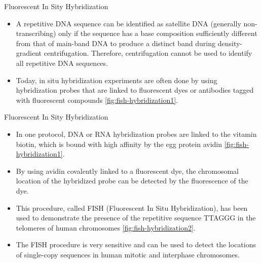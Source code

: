 \documentclass[
  ignorenonframetext,
  aspectratio=169]{beamer}
\providecommand{\tightlist}{%
  \setlength{\itemsep}{0pt}\setlength{\parskip}{0pt}}
\begin{document}
\begin{frame}{Fluorescent In Sity Hybridization}
\protect\hypertarget{fluorescent-in-sity-hybridization}{}
\begin{itemize}
\tightlist
\item
  A repetitive DNA sequence can be identified as satellite DNA
  (generally non-transcribing) only if the sequence has a base
  composition sufficiently different from that of main-band DNA to
  produce a distinct band during density-gradient centrifugation.
  Therefore, centrifugation cannot be used to identify all repetitive
  DNA sequences.
\item
  Today, in situ hybridization experiments are often done by using
  hybridization probes that are linked to fluorescent dyes or antibodies
  tagged with fluorescent compounds \ref{fig:fish-hybridization1}.
\end{itemize}
\end{frame}

\begin{frame}{Fluorescent In Sity Hybridization}
\protect\hypertarget{fluorescent-in-sity-hybridization-1}{}
\begin{itemize}
\tightlist
\item
  In one protocol, DNA or RNA hybridization probes are linked to the
  vitamin biotin, which is bound with high affinity by the egg protein
  avidin \ref{fig:fish-hybridization1}.
\item
  By using avidin covalently linked to a fluorescent dye, the
  chromosomal location of the hybridized probe can be detected by the
  fluorescence of the dye.
\item
  This procedure, called FISH (Fluorescent In Situ Hybridization), has
  been used to demonstrate the presence of the repetitive sequence
  TTAGGG in the telomeres of human chromosomes
  \ref{fig:fish-hybridization2}.
\item
  The FISH procedure is very sensitive and can be used to detect the
  locations of single-copy sequences in human mitotic and interphase
  chromosomes.
\end{itemize}
\end{frame}
\end{document}

